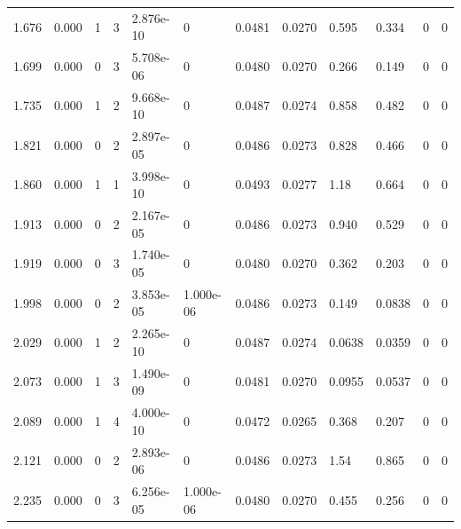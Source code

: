 \documentclass[preview]{standalone}
\begin{document}
{{\begin{tabular}{L{1.2cm}C{1.2cm} C{0.3cm}C{0.5cm} C{1.4cm}C{1.4cm} C{1.4cm}C{1.4cm} C{1.6cm}C{1.6cm} C{1.6cm}C{1.6cm}}
  1.676  &  0.000  & 1     &  3 &  2.876e-10  & 0  &  0.0481&   0.0270& 0.595 & 0.334   &  0 & 0  \\ 
  1.699  &  0.000  & 0     &  3 &  5.708e-06  & 0  &  0.0480&   0.0270& 0.266 & 0.149   &  0 & 0  \\ 
  1.735  &  0.000  & 1     &  2 &  9.668e-10  & 0  &  0.0487&   0.0274& 0.858 & 0.482   &  0 & 0  \\ 
  1.821  &  0.000  & 0     &  2 &  2.897e-05  & 0  &  0.0486&   0.0273& 0.828 & 0.466   &  0 & 0  \\ 
  1.860  &  0.000  & 1     &  1 &  3.998e-10  & 0  &  0.0493&   0.0277& 1.18 & 0.664   &  0 & 0  \\ 
  1.913  &  0.000  & 0     &  2 &  2.167e-05  & 0  &  0.0486&   0.0273& 0.940 & 0.529   &  0 & 0  \\ 
  1.919  &  0.000  & 0     &  3 &  1.740e-05  & 0  &  0.0480&   0.0270& 0.362 & 0.203   &  0 & 0  \\ 
  1.998  &  0.000  & 0     &  2 &  3.853e-05  & 1.000e-06  &  0.0486&   0.0273& 0.149 & 0.0838   &  0 & 0  \\ 
  2.029  &  0.000  & 1     &  2 &  2.265e-10  & 0  &  0.0487&   0.0274& 0.0638 & 0.0359   &  0 & 0  \\ 
  2.073  &  0.000  & 1     &  3 &  1.490e-09  & 0  &  0.0481&   0.0270& 0.0955 & 0.0537   &  0 & 0  \\ 
  2.089  &  0.000  & 1     &  4 &  4.000e-10  & 0  &  0.0472&   0.0265& 0.368 & 0.207   &  0 & 0  \\ 
  2.121  &  0.000  & 0     &  2 &  2.893e-06  & 0  &  0.0486&   0.0273& 1.54 & 0.865   &  0 & 0  \\ 
  2.235  &  0.000  & 0     &  3 &  6.256e-05  & 1.000e-06  &  0.0480&   0.0270& 0.455 & 0.256   &  0 & 0  \\ 
\hline 
\end{tabular} 

}}
\end{document}
